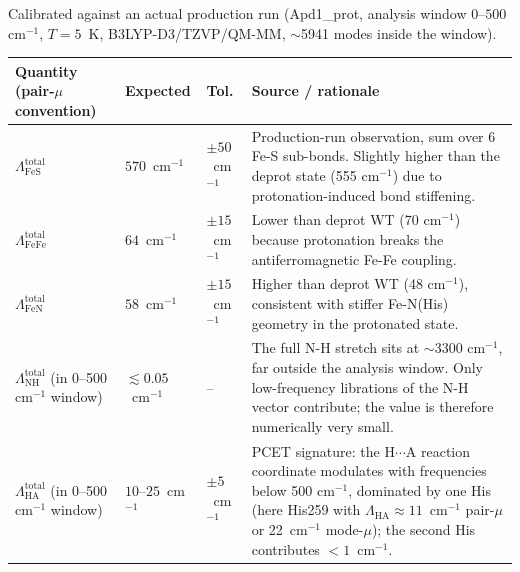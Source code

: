 \documentclass[10pt,a4paper,twoside]{article}
\begin{document}
Calibrated against an actual production run (Apd1\_prot,
analysis window $0\text{--}500$ cm$^{-1}$, $T = 5$~K,
B3LYP-D3/TZVP/QM-MM, $\sim$5941 modes inside the window).

\begin{longtable}{p{} p{} p{} p{}}
\toprule
\textbf{Quantity (pair-$\mu$ convention)} & \textbf{Expected} & \textbf{Tol.} & \textbf{Source / rationale} \\
\midrule
$\Lambda_\text{FeS}^\text{total}$
                          & $570$~cm$^{-1}$  & $\pm 50$~cm$^{-1}$
                          & Production-run observation, sum over
                            6 Fe-S sub-bonds. Slightly higher than
                            the deprot state (555 cm$^{-1}$) due to
                            protonation-induced bond stiffening. \\
$\Lambda_\text{FeFe}^\text{total}$
                          & $64$~cm$^{-1}$   & $\pm 15$~cm$^{-1}$
                          & Lower than deprot WT (70 cm$^{-1}$)
                            because protonation breaks the
                            antiferromagnetic Fe-Fe coupling. \\
$\Lambda_\text{FeN}^\text{total}$
                          & $58$~cm$^{-1}$   & $\pm 15$~cm$^{-1}$
                          & Higher than deprot WT (48 cm$^{-1}$),
                            consistent with stiffer Fe-N(His)
                            geometry in the protonated state. \\
$\Lambda_\text{NH}^\text{total}$ (in 0--500 cm$^{-1}$ window)
                          & $\lesssim 0.05$~cm$^{-1}$ & --
                          & The full N-H stretch sits at $\sim$3300
                            cm$^{-1}$, far outside the analysis
                            window. Only low-frequency librations
                            of the N-H vector contribute; the
                            value is therefore numerically very
                            small. \\
$\Lambda_\text{HA}^\text{total}$ (in 0--500 cm$^{-1}$ window)
                          & $10$--$25$~cm$^{-1}$ & $\pm 5$~cm$^{-1}$
                          & PCET signature: the H$\cdots$A reaction
                            coordinate modulates with frequencies
                            below 500 cm$^{-1}$, dominated by one
                            His (here His259 with
                            $\Lambda_\text{HA}\approx 11$~cm$^{-1}$
                            pair-$\mu$ or 22~cm$^{-1}$ mode-$\mu$);
                            the second His contributes
                            $< 1$~cm$^{-1}$. \\
\bottomrule
\end{longtable}
\end{document}
